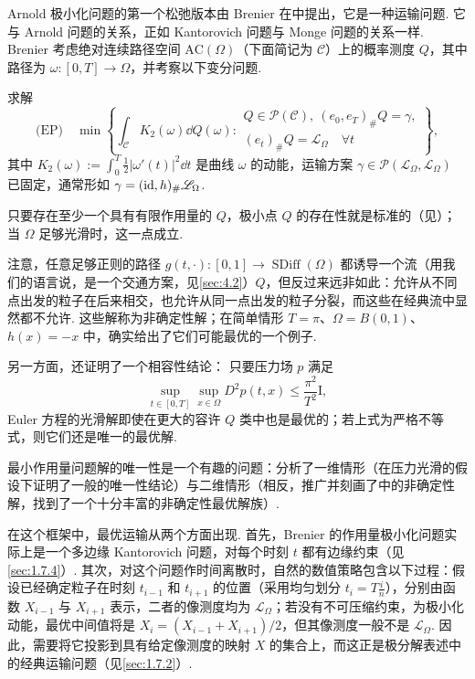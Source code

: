 Arnold 极小化问题的第一个松弛版本由 Brenier 在\cite{b83}中提出，它是一种运输问题. 它与 Arnold 问题的关系，正如 Kantorovich 问题与 Monge 问题的关系一样. \label{idx:i98-p314}
Brenier 考虑绝对连续路径空间 $\mathrm{AC}(\Omega)$（下面简记为 $\mathscr C$）上的概率测度 $Q$，其中路径为 $\omega:[0,T]\to\Omega$，并考察以下变分问题.

\begin{problem}\label{obj:8.11}
求解
\begin{equation}\label{eq:8.21}
\text{(EP)}\quad\min\left\{\int_{\mathscr C}K_2(\omega)\dd Q(\omega):
\begin{array}{l}
Q\in\mathscr P(\mathscr C),\ (e_0,e_T)_\#Q=\gamma,\\
(e_t)_\#Q=\mathscr L_\Omega\quad\forall t
\end{array}\right\},
\end{equation}
其中 $K_2(\omega):=\int_0^T\frac12|\omega'(t)|^2\dd t$ 是曲线 $\omega$ 的动能，运输方案 $\gamma\in\mathscr P(\mathscr L_\Omega,\mathscr L_\Omega)$ 已固定，通常形如 $\gamma=(\operatorname{id},h)_\#\mathscr L_\Omega$.
\end{problem}
只要存在至少一个具有有限作用量的 $Q$，极小点 $Q$ 的存在性就是标准的（见\cite{b83}）；当 $\Omega$ 足够光滑时，这一点成立.

注意，任意足够正则的路径 $g(t,\cdot):[0,1]\to\operatorname{SDiff}(\Omega)$ 都诱导一个流（用我们的语言说，是一个交通方案，见\autoref{sec:4.2}）$Q$，但反过来远非如此：允许从不同点出发的粒子在后来相交，也允许从同一点出发的粒子分裂，而这些在经典流中显然都不允许. 这些解称为非确定性解；\cite{b83}在简单情形 $T=\pi$、$\Omega=B(0,1)$、$h(x)=-x$ 中，确实给出了它们可能最优的一个例子.

另一方面，\cite{b83}还证明了一个相容性结论：\label{idx:i118-p315}
只要压力场 $p$ 满足
\begin{equation}\label{eq:8.22}
\sup_{t\in[0,T]}\sup_{x\in\Omega}D^2p(t,x)\leq\frac{\pi^2}{T^2}\mathrm I,
\end{equation}
Euler 方程的光滑解即使在更大的容许 $Q$ 类中也是最优的；若上式为严格不等式，则它们还是唯一的最优解.

最小作用量问题解的唯一性是一个有趣的问题：\cite{b51}分析了一维情形（在压力光滑的假设下证明了一般的唯一性结论）与二维情形（相反，\cite{b51}推广并刻画了\cite{b83}中的非确定性解，找到了一个十分丰富的非确定性最优解族）.

在这个框架中，最优运输从两个方面出现. 首先，Brenier 的作用量极小化问题实际上是一个多边缘 Kantorovich 问题，对每个时刻 $t$ 都有边缘约束（见\autoref{sec:1.7.4}）. 其次，对这个问题作时间离散时，自然的数值策略包含以下过程：假设已经确定粒子在时刻 $t_{i-1}$ 和 $t_{i+1}$ 的位置（采用均匀划分 $t_i=T\frac in$），分别由函数 $X_{i-1}$ 与 $X_{i+1}$ 表示，二者的像测度均为 $\mathscr L_\Omega$；若没有不可压缩约束，为极小化动能，最优中间值将是 $X_i=(X_{i-1}+X_{i+1})/2$，但其像测度一般不是 $\mathscr L_\Omega$. 因此，需要将它投影到具有给定像测度的映射 $X$ 的集合上，而这正是极分解表述中的经典运输问题（见\autoref{sec:1.7.2}）.

